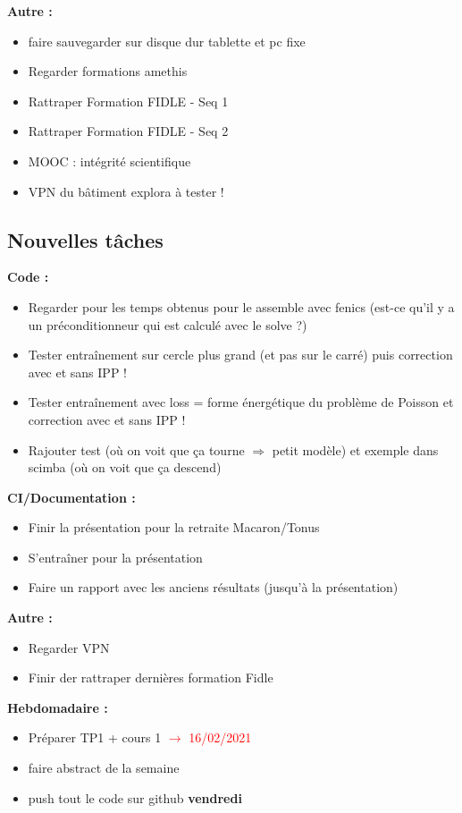 \textbf{Autre :}
\begin{itemize}[label=$\square$] 
	\item[\previous{4}] faire sauvegarder sur disque dur tablette et pc fixe
	\item[\previous{6}] Regarder formations amethis
	\item[\previous{7}] Rattraper Formation FIDLE - Seq 1
	\item[\previous{8}] Rattraper Formation FIDLE - Seq 2
	\item[\previous{8}] MOOC : intégrité scientifique
	\item[\previous{8}] VPN du bâtiment explora à tester !
\end{itemize}

\subsection*{Nouvelles tâches}

\textbf{Code :}
\begin{itemize}[label=$\square$] 
	\item[\previous{12}] Regarder pour les temps obtenus pour le assemble avec fenics (est-ce qu'il y a un préconditionneur qui est calculé avec le solve ?)
	\item[\previous{12}] Tester entraînement sur cercle plus grand (et pas sur le carré) puis correction avec et sans IPP !
	\item[\previous{12}] Tester entraînement avec loss = forme énergétique du problème de Poisson et correction avec et sans IPP !
	\item[\previous{12}] Rajouter test (où on voit que ça tourne $\Rightarrow$ petit modèle) et exemple dans scimba (où on voit que ça descend)
\end{itemize}
\textbf{CI/Documentation :}
\begin{itemize}[label=$\square$] 
	\item[\done] Finir la présentation pour la retraite Macaron/Tonus
	\item S'entraîner pour la présentation
	\item[\previous{15}] Faire un rapport avec les anciens résultats (jusqu'à la présentation)
\end{itemize}
\textbf{Autre :}
\begin{itemize}[label=$\square$] 
	\item[\textbf{\later}] Regarder VPN
	\item Finir der rattraper dernières formation Fidle
\end{itemize}
\textbf{Hebdomadaire :}
\begin{itemize}[label=$\square$] 
	\item Préparer TP1 + cours 1 \textcolor{red}{$\rightarrow$ 16/02/2021}
	\item faire abstract de la semaine 
	\item push tout le code sur github \textbf{vendredi}
\end{itemize}
